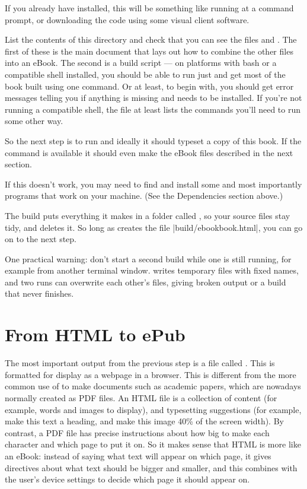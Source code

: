 If you already have  installed, this will be something
like running  at a command prompt, or
downloading the code using some visual client software. 

List the contents of this directory and check that you can see the
files  and . The first of these
is the main \tex document that lays out how to combine the other files
into an eBook.  The second is a build script --- on platforms with
bash or a compatible shell installed, you should be able to run just
 and get most of the book built using one
command. Or at least, to begin with, you should get error messages
telling you if anything is missing and needs to be installed. If you're not
running a compatible shell, the  file at least lists
the commands you'll need to run some other way.

So the next step is to run  and ideally it should
typeset a copy of this book. If the  command is
available it should even make the eBook files described in the next
section.

If this doesn't work, you may need to find and install some
 and most importantly 
programs that work on your machine. (See the
Dependencies section above.)

The build puts everything it makes in a folder called ,
so your source files stay tidy, and  deletes it.
So long as  creates the file \sverb|build/ebookbook.html|,
you can go on to the next step.

One practical warning: don't start a second build while one is still running, for example from another terminal window.
 writes temporary files with fixed names, and two runs can overwrite each other's files, giving broken output or a build that never finishes.

\section{From HTML to ePub}
\label{sec:html2epub}

The most important output from the previous step is a file called
.  This is formatted for display as a webpage
in a browser. This is different from the more common use of \tex to
make documents such as academic papers, which are nowadays normally
created as PDF files. An HTML file is a collection of content (for
example, words and images to display), and typesetting suggestions
(for example, make this text a heading, and make this image 40\% of
the screen width). By contrast, a PDF file has
precise instructions about how big to make each character and which
page to put it on. So it makes sense that HTML is more like an eBook:
instead of saying what text will appear on which page, it gives
directives about what text should be bigger and smaller, and this
combines with the user's device settings to decide which page it
should appear on.

